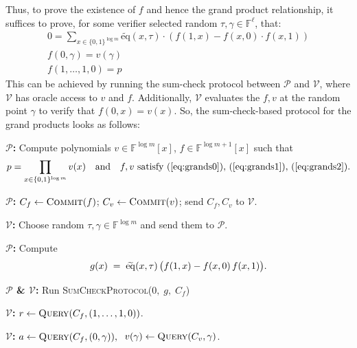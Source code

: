 \documentclass[../../book]{subfiles}
\begin{document}
Thus, to prove the existence of $f$ and hence the grand product relationship, it suffices
to prove, for some verifier selected random $\tau, \gamma \in \mathbb{F}^\ell$, that:
\begin{gather}
\label{eq:grands0}
    0 = \sum_{x \in \{0,1\}^{\log m}} \widetilde{\text{eq}}(x, \tau) \cdot (f(1,x) - f(x, 0) \cdot f(x, 1))\\
\label{eq:grands1}
    f(0, \gamma) = v(\gamma)\\
\label{eq:grands2}
    f(1,\dots,1, 0) = p
\end{gather}
This can be achieved by running the sum-check protocol between $\mathcal{P}$ and $\mathcal{V}$, where $\mathcal{V}$ 
has oracle access to $v$ and $f$. Additionally, $\mathcal{V}$ evaluates the $f, v$ at the random point $\gamma$ to 
verify that $f(0, x) = v(x)$. So, the sum-check-based protocol for the grand products looks as follows:
\newline
\begin{algorithm}[H]
\caption{Sum-Check-based Protocol for Grand Products}\label{alg:sum_check_grand_product}
\DontPrintSemicolon
\SetAlgoLined

\textbf{$\mathcal P$:}
Compute polynomials 
$v\in\mathbb{F}^{\log m}[x]$, 
$f\in\mathbb{F}^{\log m+1}[x]$ 
such that
\vspace{-0.8em}
\begin{equation*}
    \vspace{-1.6em}
    p = \prod_{x\in\{0,1\}^{\log m}} v(x)
    \quad\text{and}\quad
    f, v \text{ satisfy }(\ref{eq:grands0}),\,(\ref{eq:grands1}),\,(\ref{eq:grands2}).
\end{equation*}\;

\textbf{$\mathcal P$:}
$C_f \leftarrow \textsc{Commit}(f)$;
$C_v \leftarrow \textsc{Commit}(v)$;
send $C_f, C_v$ to $\mathcal V$.\;

\textbf{$\mathcal V$:}
Choose random $\tau,\gamma\in\mathbb{F}^{\log m}$ and send them to $\mathcal P$.\;

\textbf{$\mathcal P$:}
Compute
\vspace{-0.8em}
\begin{equation*}
    \vspace{-1.6em}
    g(x)\;=\;\widetilde{\mathrm{eq}}(x,\tau)\,\bigl(f(1,x)-f(x,0)\,f(x,1)\bigr).
\end{equation*}\;

\textbf{$\mathcal P$ \& $\mathcal V$:}
Run \textsc{SumCheckProtocol}($0,\;g,\;C_f$)


\textbf{$\mathcal V$:}
$r \leftarrow \textsc{Query}(C_f,(1,\dots,1,0))$.\;

\textbf{$\mathcal V$:}
$a \leftarrow \textsc{Query}(C_f,(0,\gamma)), \;$ $v(\gamma)\leftarrow \textsc{Query}(C_v,\gamma)$.\;
\end{algorithm}
\end{document}

